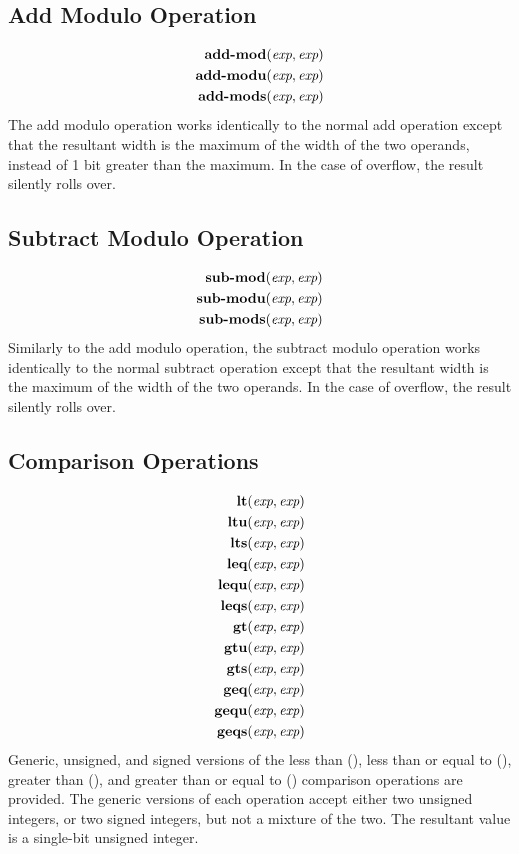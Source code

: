 \documentclass[12pt]{article}
\begin{document}
\subsection{Add Modulo Operation}
\[
\begin{aligned}
\text{\bf add-mod}(\text{\em exp}, \text{\em exp})      \\
\text{\bf add-modu}(\text{\em exp}, \text{\em exp})     \\
\text{\bf add-mods}(\text{\em exp}, \text{\em exp})     \\
\end{aligned}
\]
The add modulo operation works identically to the normal add operation except that the resultant width is the maximum of the width of the two operands, instead of 1 bit greater than the maximum. In the case of overflow, the result silently rolls over.

\subsection{Subtract Modulo Operation}
\[
\begin{aligned}
\text{\bf sub-mod}(\text{\em exp}, \text{\em exp})      \\
\text{\bf sub-modu}(\text{\em exp}, \text{\em exp})     \\
\text{\bf sub-mods}(\text{\em exp}, \text{\em exp})     \\
\end{aligned}
\]
Similarly to the add modulo operation, the subtract modulo operation works identically to the normal subtract operation except that the resultant width is the maximum of the width of the two operands. In the case of overflow, the result silently rolls over.

\subsection{Comparison Operations}
\[
\begin{aligned}
\text{\bf lt}(\text{\em exp}, \text{\em exp})     \\
\text{\bf ltu}(\text{\em exp}, \text{\em exp})    \\
\text{\bf lts}(\text{\em exp}, \text{\em exp})    \\
\text{\bf leq}(\text{\em exp}, \text{\em exp})    \\
\text{\bf lequ}(\text{\em exp}, \text{\em exp})   \\
\text{\bf leqs}(\text{\em exp}, \text{\em exp})   \\
\text{\bf gt}(\text{\em exp}, \text{\em exp})     \\
\text{\bf gtu}(\text{\em exp}, \text{\em exp})    \\
\text{\bf gts}(\text{\em exp}, \text{\em exp})    \\
\text{\bf geq}(\text{\em exp}, \text{\em exp})    \\
\text{\bf gequ}(\text{\em exp}, \text{\em exp})   \\
\text{\bf geqs}(\text{\em exp}, \text{\em exp})   \\
\end{aligned}
\]
Generic, unsigned, and signed versions of the less than (), less than or equal to (), greater than (), and greater than or equal to () comparison operations are provided. The generic versions of each operation accept either two unsigned integers, or two signed integers, but not a mixture of the two. The resultant value is a single-bit unsigned integer.
\end{document}
